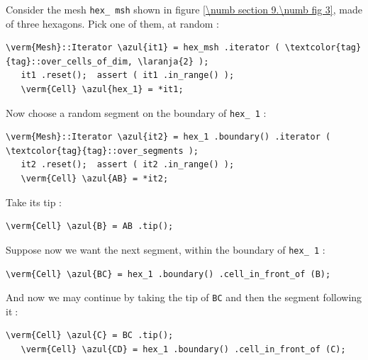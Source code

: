 Consider the mesh {\small\tt hex\_\,msh} shown in figure \ref{\numb section 9.\numb fig 3},
made of three hexagons.
Pick one of them, at random :

\begin{Verbatim}[commandchars=\\\{\},formatcom=\small\tt,
   baselinestretch=0.94,framesep=2mm                      ]
   \verm{Mesh}::Iterator \azul{it1} = hex_msh .iterator ( \textcolor{tag}{tag}::over_cells_of_dim, \laranja{2} );
   it1 .reset();  assert ( it1 .in_range() );
   \verm{Cell} \azul{hex_1} = *it1;
\end{Verbatim}

Now choose a random segment on the boundary of {\small\tt hex\_\,1} :

\begin{Verbatim}[commandchars=\\\{\},formatcom=\small\tt,
   baselinestretch=0.94,framesep=2mm                      ]
   \verm{Mesh}::Iterator \azul{it2} = hex_1 .boundary() .iterator ( \textcolor{tag}{tag}::over_segments );
   it2 .reset();  assert ( it2 .in_range() );
   \verm{Cell} \azul{AB} = *it2;
\end{Verbatim}

Take its tip :

\begin{Verbatim}[commandchars=\\\{\},formatcom=\small\tt,
   baselinestretch=0.94,framesep=2mm                      ]
   \verm{Cell} \azul{B} = AB .tip();
\end{Verbatim}

Suppose now we want the next segment, within the boundary of {\small\tt hex\_\,1} :

\begin{Verbatim}[commandchars=\\\{\},formatcom=\small\tt,
   baselinestretch=0.94,framesep=2mm                      ]
   \verm{Cell} \azul{BC} = hex_1 .boundary() .cell_in_front_of (B);
\end{Verbatim}

And now we may continue by taking the tip of {\small\tt BC} and then the segment
following it$\;$:

\begin{Verbatim}[commandchars=\\\{\},formatcom=\small\tt,
   baselinestretch=0.94,framesep=2mm                      ]
   \verm{Cell} \azul{C} = BC .tip();
   \verm{Cell} \azul{CD} = hex_1 .boundary() .cell_in_front_of (C);
\end{Verbatim}

